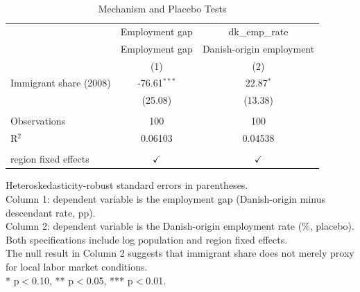 \begin{table}[htbp]
   \caption{\label{tab:placebo} Mechanism and Placebo Tests}
   \bigskip
   \centering
   \begin{tabular}{lcc}
      \toprule
                             & Employment gap & dk\_emp\_rate\\    
                             & Employment gap & Danish-origin employment \\   
                             & (1)            & (2)\\  
      \midrule 
      Immigrant share (2008) & -76.61$^{***}$ & 22.87$^{*}$\\   
                             & (25.08)        & (13.38)\\   
       \\
      Observations           & 100            & 100\\  
      R$^2$                  & 0.06103        & 0.04538\\  
       \\
      region fixed effects   & $\checkmark$   & $\checkmark$\\   
      \bottomrule
   \end{tabular}
   
   \par \raggedright 
   Heteroskedasticity-robust standard errors in parentheses.\\
   Column 1: dependent variable is the employment gap (Danish-origin minus descendant rate, pp).\\
   Column 2: dependent variable is the Danish-origin employment rate (\%, placebo).\\
   Both specifications include log population and region fixed effects.\\
   The null result in Column 2 suggests that immigrant share does not merely proxy for local labor market conditions.\\
   * p$<$0.10, ** p$<$0.05, *** p$<$0.01.
\end{table}
